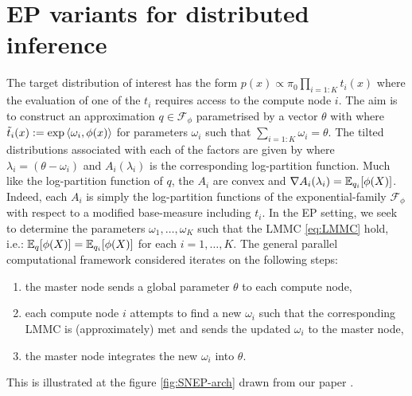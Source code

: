 \section{\label{sec:ep-for-dbi}EP variants for distributed inference}
The target distribution of interest has the form $p(x)\propto \pi_0\prod_{i=1:K}t_i(x)$ where the evaluation of one of the $t_i$ requires access to the compute node $i$. The aim is to construct an approximation $q\in\mathcal F_\phi$ parametrised by a vector $\theta$ with
%
%
where $\tilde t_i(x):=\exp\left\langle \omega_i,\phi(x) \right\rangle$ for parameters $\omega_{i}$ such that $\sum_{i=1:K}\omega_i=\theta$. The tilted distributions associated with each of the factors are given by
%
% 
where $\lambda_i=(\theta-\omega_i)$ and $A_i(\lambda_i)$ is the corresponding log-partition function. Much like the log-partition function of $q$, the $A_i$ are convex and $\nabla A_i(\lambda_i)=\mathbb E_{q_i}[\phi(X)]$. Indeed, each $A_i$ is simply the log-partition functions of the exponential-family $\mathcal F_\phi$ with respect to a modified base-measure including $t_i$.
In the EP setting, we seek to determine the parameters $\omega_1,\dots,\omega_K$ such that the LMMC \eqref{eq:LMMC} hold, i.e.: $\mathbb E_q[\phi(X)]=\mathbb E_{q_i}[\phi(X)]$ for each $i=1,\dots,K$.
The general parallel computational framework considered iterates on the following steps:
\begin{enumerate}\itsepa
	\item the master node sends a global parameter $\theta$ to each compute node,
	\item each compute node $i$ attempts to find a new $\omega_i$ such that the corresponding LMMC is (approximately) met and sends the updated $\omega_i$ to the master node,
	\item the master node integrates the new $\omega_i$ into $\theta$.
\end{enumerate} 

\noindent This is illustrated at the figure \ref{fig:SNEP-arch} drawn from our paper \citep{hasenclever16}.

